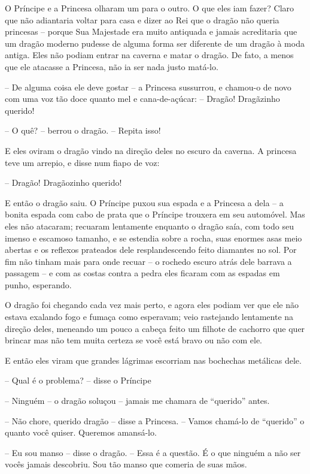 O Príncipe e a Princesa olharam um para o outro. O que eles iam fazer?
Claro que não adiantaria voltar para casa e dizer ao Rei que o dragão
não queria princesas -- porque Sua Majestade era muito antiquada e
jamais acreditaria  que um dragão moderno pudesse de alguma forma ser
diferente de um dragão à moda antiga. Eles não podiam entrar na
caverna e matar o dragão. De fato, a menos que ele atacasse a
Princesa, não ia ser nada justo matá-lo.

-- De alguma coisa ele deve gostar -- a Princesa sussurrou, e chamou-o
de novo com uma voz tão doce quanto mel e cana-de-açúcar: -- Dragão!
Dragãzinho querido!

-- O quê? -- berrou o dragão. -- Repita isso!

E eles oviram o dragão vindo na direção deles no escuro da caverna. A
princesa teve um arrepio, e disse num fiapo de voz:

-- Dragão! Dragãozinho querido!

E então o dragão saiu. O Príncipe puxou sua espada e a Princesa a dela
-- a bonita espada com cabo de prata que o Príncipe trouxera em seu
automóvel. Mas eles não atacaram; recuaram lentamente enquanto o
dragão saía, com todo seu imenso e escamoso tamanho, e se estendia
sobre a rocha, suas enormes asas meio abertas e os reflexos prateados
dele resplandescendo feito diamantes no sol. Por fim não tinham mais
para onde recuar -- o rochedo escuro atrás dele barrava a passagem -- e
com as costas contra a pedra eles ficaram com as espadas em punho,
esperando.

O dragão foi chegando cada vez mais perto, e agora eles podiam ver que
ele não estava exalando fogo e fumaça como esperavam; veio rastejando
lentamente na direção deles, meneando um pouco a cabeça feito um
filhote de cachorro que quer brincar mas não tem muita certeza se
você está bravo ou não com ele.

E então eles viram que grandes lágrimas escorriam nas bochechas
metálicas dele.

-- Qual é o problema? -- disse o Príncipe

-- Ninguém -- o dragão soluçou -- jamais me chamara de “querido” antes.

-- Não chore, querido dragão -- disse a Princesa. -- Vamos chamá-lo de
“querido” o quanto você quiser. Queremos amansá-lo.

-- Eu sou manso -- disse o dragão. -- Essa é a questão. É o que ninguém a
não ser vocês jamais descobriu. Sou tão manso que comeria de suas
mãos.

